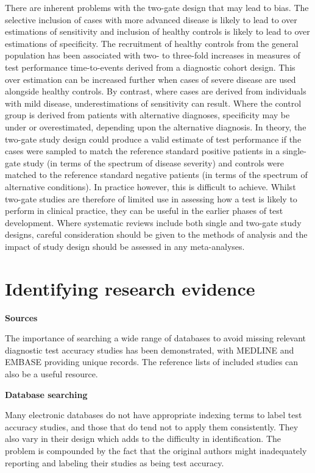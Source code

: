 \documentclass[
  11pt,
  a4paper,
  DIV=11,
  numbers=noendperiod]{scrreprt}
\begin{document}
There are inherent problems with the two-gate design that may lead to
bias. The selective inclusion of cases with more advanced disease is
likely to lead to over estimations of sensitivity and inclusion of
healthy controls is likely to lead to over estimations of specificity.
The recruitment of healthy controls from the general population has been
associated with two- to three-fold increases in measures of test
performance time-to-events derived from a diagnostic cohort design. This
over estimation can be increased further when cases of severe disease
are used alongside healthy controls. By contrast, where cases are
derived from individuals with mild disease, underestimations of
sensitivity can result. Where the control group is derived from patients
with alternative diagnoses, specificity may be under or overestimated,
depending upon the alternative diagnosis. In theory, the two-gate study
design could produce a valid estimate of test performance if the cases
were sampled to match the reference standard positive patients in a
single-gate study (in terms of the spectrum of disease severity) and
controls were matched to the reference standard negative patients (in
terms of the spectrum of alternative conditions). In practice however,
this is difficult to achieve. Whilst two-gate studies are therefore of
limited use in assessing how a test is likely to perform in clinical
practice, they can be useful in the earlier phases of test development.
Where systematic reviews include both single and two-gate study designs,
careful consideration should be given to the methods of analysis and the
impact of study design should be assessed in any meta-analyses.

\section{Identifying research
evidence}\label{identifying-research-evidence-1}

\textbf{Sources}

The importance of searching a wide range of databases to avoid missing
relevant diagnostic test accuracy studies has been demonstrated, with
MEDLINE and EMBASE providing unique records. The reference lists of
included studies can also be a useful resource.

\textbf{Database searching}

Many electronic databases do not have appropriate indexing terms to
label test accuracy studies, and those that do tend not to apply them
consistently. They also vary in their design which adds to the
difficulty in identification. The problem is compounded by the fact that
the original authors might inadequately reporting and labeling their
studies as being test accuracy.
\end{document}

